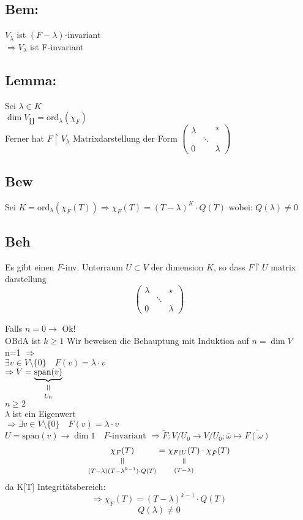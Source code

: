 \documentclass[titlepage,12pt,a4paper,ngerman]{report}
\newcommand{\verteq}{\rotatebox{90}{$\,=$}}
\newcommand{\equalto}[2]{\underset{\scriptstyle\overset{\mkern4mu\verteq}{#2}}{#1}}
\newcommand{\tx}[1]{\textrm{#1}}
\newcommand{\ov}[1]{\overline{#1}}
\newcommand{\spa}{\tx{span}}
\newcommand{\ord}{\tx{ord}}
\begin{document}
\subsection{Bem:}
$V_\lambda $ ist $(F-\lambda)$-invariant\\
$\Rightarrow V_\lambda$ ist F-invariant
\subsection{Lemma:}
Sei $\lambda \in K $\\
$\dim V_\amalg = \ord_\lambda (\chi_F)$\\
Ferner hat $ F \upharpoonright V_\lambda $ Matrixdarstellung der Form
$\begin{pmatrix}
\lambda & & * \\
& \ddots \\
0 & & \lambda
\end{pmatrix}$

\subsection{Bew}
Sei $K = \tx{ord}_\lambda ( \chi_F(T))
\Rightarrow \chi_F (T) = (T - \lambda)^K \cdot Q(T)$ wobei: $Q(\lambda) \neq 0$ 
\subsection{Beh}
Es gibt einen $F$-inv. Unterraum $U \subset V$ der dimension $K$, so dass $F \upharpoonright U$ matrix darstellung $$\begin{pmatrix}
\lambda & & \star \\ & \ddots & \\ 0 & & \lambda
\end{pmatrix}$$

Falls $ n=0  \rightarrow $ Ok!\\
OBdA ist $ k\ge 1 $ Wir beweisen die Behauptung mit Induktion auf $ n = \dim V $\\
n=1 $\Rightarrow$\\
$\exists v \in V\setminus \{0\} \quad F(v) = \lambda \cdot v$\\
$\Rightarrow V = \equalto{\underbrace{\spa (v)}}{U_0}$\\
$n\ge 2$\\
$\lambda$ ist ein Eigenwert\\
$\Rightarrow \exists v \in V \setminus \{0\} \quad F(v) = \lambda\cdot v$\\
$U = \spa (v) \rightarrow \dim 1 \quad F\tx{-invariant}$
$\Rightarrow\tilde{F}: V/U_0 \rightarrow V/U_0 ; \bar{\omega} \mapsto \ov{F(\omega)}$
$$\equalto{\chi_F(T)}{(T-\lambda)(T-\lambda^{k-1}) \cdot Q(T)} = \equalto{\chi_{F \upharpoonright U}(T)}{(T-\lambda)} \cdot \chi_{\tilde{F}}(T)$$
da K[T] Integritätsbereich:
$$\Rightarrow \chi_{\tilde{F}} (T) = (T-\lambda)^{k-1} \cdot Q(T)$$
$$ Q(\lambda)\neq 0$$
\end{document}
